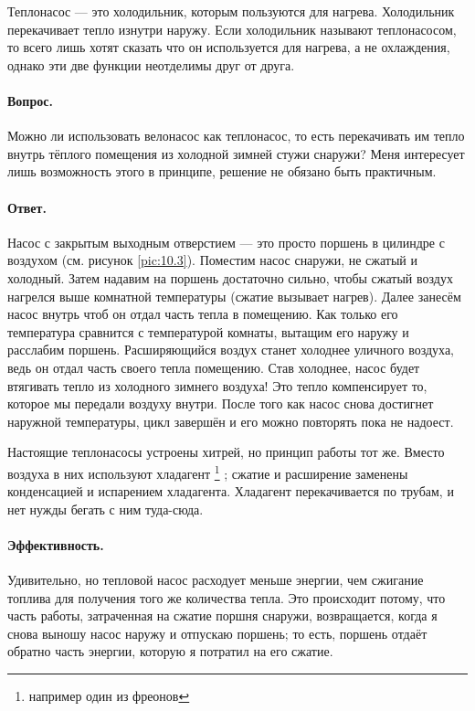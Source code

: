 Теплонасос --- это холодильник, которым пользуются для нагрева.
Холодильник перекачивает тепло изнутри наружу.
Если холодильник называют теплонасосом, то всего лишь хотят сказать что он используется для нагрева, а не охлаждения,
однако эти две функции неотделимы друг от друга.

\paragraph{Вопрос.}
Можно ли использовать велонасос как теплонасос, то есть перекачивать им тепло внутрь тёплого помещения из холодной зимней стужи снаружи?
Меня интересует лишь возможность этого в принципе, решение не обязано быть практичным.

\paragraph{Ответ.}
Насос с закрытым выходным отверстием --- это просто поршень в цилиндре с воздухом (см. рисунок \ref{pic:10.3}).
Поместим насос снаружи, не сжатый и холодный.
Затем надавим на поршень достаточно сильно, чтобы сжатый воздух нагрелся выше комнатной температуры (сжатие вызывает нагрев).
Далее занесём насос внутрь чтоб он отдал часть тепла в помещению.
Как только его температура сравнится с температурой комнаты, вытащим его наружу и расслабим поршень.
Расширяющийся воздух станет холоднее уличного воздуха, ведь он отдал часть своего тепла помещению.
Став холоднее, насос будет втягивать тепло из холодного зимнего воздуха!
Это тепло компенсирует то, которое мы передали воздуху внутри.
После того как насос снова достигнет наружной температуры, цикл завершён и его можно повторять пока не надоест.

Настоящие теплонасосы устроены хитрей, но принцип работы тот же.
Вместо воздуха в них используют хладагент%
\footnote{например один из фреонов \pr}%
; сжатие и расширение заменены конденсацией и испарением хладагента.
Хладагент перекачивается по трубам, и нет нужды бегать с ним туда-сюда.

\paragraph{Эффективность.}
Удивительно, но тепловой насос расходует меньше энергии, чем сжигание топлива для получения того же количества тепла.
Это происходит потому, что часть работы, затраченная на сжатие поршня снаружи, возвращается, когда я снова выношу насос наружу и отпускаю поршень; то есть, поршень отдаёт обратно часть энергии, которую я потратил на его сжатие.

